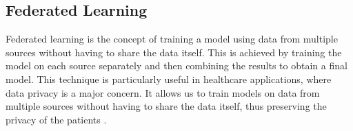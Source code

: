 \documentclass[../main.tex]{subfiles}
\begin{document}






    \subsection{Federated Learning} \label{sec:federated_learning}

    Federated learning is the concept of training a model using data from multiple sources without having to share the data itself. This is achieved by training the model on each source separately and then combining the results to obtain a final model. This technique is particularly useful in healthcare applications, where data privacy is a major concern. It allows us to train models on data from multiple sources without having to share the data itself, thus preserving the privacy of the patients \cite{joshi_federated_2022}.
\end{document}
